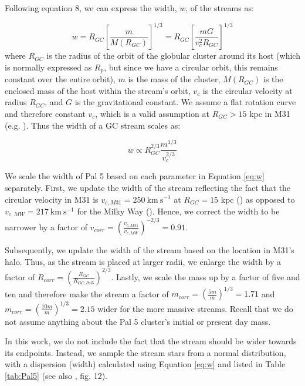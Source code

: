 \documentclass[twocolumn]{aastex62}
\newcommand{\kms}{\ensuremath{\textrm{km}~\textrm{s}^{-1}}}
\begin{document}
Following \citet{johnston01} equation 8, we can express the width, $w$, of the streams as:

\begin{equation}
w = R_{GC} \left[\frac{m}{M(R_{GC})}\right]^{1/3} = R_{GC} \left[\frac{m G}{v_c^2 R_{GC}}\right]^{1/3} 
\end{equation}
where $R_{GC}$ is the radius of the orbit of the globular cluster around its host (which is normally expressed as $R_p$, but since we have a circular orbit, this remains constant over the entire orbit), $m$ is the mass of the cluster, $M(R_{GC})$ is the enclosed mass of the host within the stream's orbit, $v_c$ is the circular velocity at radius $R_{GC}$, and $G$ is the gravitational constant. We assume a flat rotation curve and therefore constant  $v_c$, which is a valid assumption at $R_{GC} > 15$ kpc in M31 (e.g. \citealt{chemin09}). Thus the width of a GC stream scales as:

\begin{equation}
\label{eq:w}
w \propto R_{GC}^{2/3} \frac{m^{1/3}}{v_c^{2/3}}
\end{equation}

We scale the width of Pal 5 based on each parameter in Equation \ref{eq:w} separately. First, we update the width of the stream reflecting the fact that the circular velocity in M31 is $v_{c, M31}= 250 ~\kms$ at $R_{GC} = 15$ kpc (\citealt{chemin09}) as opposed to $v_{c, MW}= 217 ~\kms$ for the Milky Way (\citealt{eilers19}). Hence, we correct the width to be narrower by a factor of $v_{corr} =  \left(\frac{v_{c,M31}}{v_{c,MW}}\right)^{-2/3} = 0.91$.

Subsequently, we update the width of the stream based on the location in M31's halo. Thus, as the stream is placed at larger radii, we enlarge the width by a factor of  $R_{corr} = \left(\frac{R_{GC}}{R_{GC,Pal5}}\right)^{2/3}$. Lastly, we scale the mass up by a factor of five and ten and therefore make the stream a factor of $m_{corr} = \left(\frac{5m}{m}\right)^{1/3}= 1.71$  and $m_{corr} = \left(\frac{10m}{m}\right)^{1/3}= 2.15$ wider for the more massive streams. Recall that we do not assume anything about the Pal 5 cluster's initial or present day mass. 

In this work, we do not include the fact that the stream should be wider towards its endpoints. Instead, we sample the stream stars from a normal distribution, with a dispersion (width) calculated using Equation \ref{eq:w} and listed in Table \ref{tab:Pal5} (see also \citealt{ibata16}, fig. 12).
\end{document}

